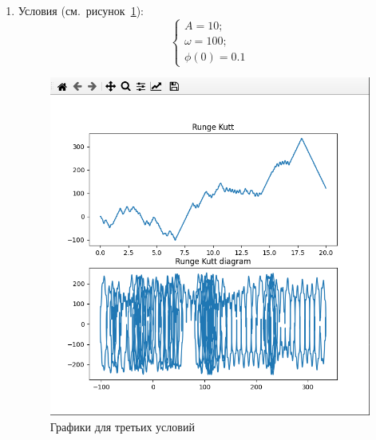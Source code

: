\documentclass[a4paper,12pt]{article}
\begin{document}
\begin{enumerate}
		\item Условия (см.~рисунок~\ref{fig:3_praq}):
		\begin{equation}
			\begin{cases}
				A = 10; \\
				\omega = 100; \\
				\phi(0) = 0.1
			\end{cases}
		\end{equation}
		\begin{figure}[ht!]
			\begin{center}
			\includegraphics[scale=0.3]{sources/3_praq.png}
			\end{center}
			\vspace*{-8mm}
			\caption{Графики для третьих условий}\label{fig:3_praq}
	  	\end{figure}


\end{enumerate}
\end{document}
